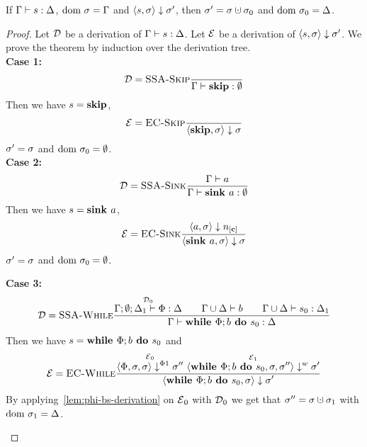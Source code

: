 \begin{theorem}
    If $\Gamma \vdash {s}: \Delta$, $\text{dom } \sigma = \Gamma$ and
    $\langle s, \sigma \rangle \downarrow \sigma'$, then $\store' = \store \dunion \store_0$
    and $\text{dom }{\sigma_0} = \Delta$.
\end{theorem}
\begin{proof}
    Let $\operatorname{\mathcal{D}}$ be a derivation of $\Gamma \vdash {s}: \Delta$.
    Let $\operatorname{\mathcal{E}}$ be a derivation of $\langle s, \sigma \rangle \downarrow \sigma'$.
    We prove the theorem by induction over the derivation tree.\\
    \textbf{Case 1:}
    \begin{align*}
        \operatorname{\mathcal{D}} = \textsc{SSA-Skip}\frac{\displaystyle }{\displaystyle \Gamma \vdash {\textbf{skip}}: \emptyset}
    \end{align*}
    Then we have $s = \textbf{skip}$,
    \begin{align*}
        \operatorname{\mathcal{E}} = \textsc{EC-Skip}\frac{\displaystyle }{\displaystyle \langle \textbf{skip}, \sigma \rangle \downarrow \sigma}
    \end{align*}
    $\sigma' = \sigma$ and $\text{dom }{\sigma_0} = \emptyset$.\\
    \textbf{Case 2:}
    \begin{align*}
        \operatorname{\mathcal{D}} = \textsc{SSA-Sink}\frac{\displaystyle \Gamma \vdash {a}}{\displaystyle \Gamma \vdash {\textbf{sink }{a}}: \emptyset}
    \end{align*}
    Then we have $s = \textbf{sink }{a}$,
    \begin{align*}
        \E =     \bsrule{EC-Sink}{\bigstep{a}{\store}{\clean{}}}
        {\bigstep{\defaultsink}{\store}{\store}}    
    \end{align*}
    $\sigma' = \sigma$ and $\text{dom }{\sigma_0} = \emptyset$.\\
    \begin{landscape}
        \textbf{Case 3:}
        \begin{align*}
            \operatorname{\mathcal{D}} = \textsc{SSA-While}\frac{\displaystyle \overset{\operatorname{\mathcal{D}}_0}{\Gamma;\emptyset;\Delta_1 \vdash {\Phi}: \Delta}\qquad
            \Gamma \cup \Delta \vdash {b}\qquad
            \Gamma \cup \Delta \vdash {s_0}: \Delta_1}{\displaystyle \Gamma \vdash {\textbf{while }\Phi;{b} \textbf{ do } {s_0}}: \Delta}
        \end{align*}
        Then we have $s = \textbf{while }\Phi;{b} \textbf{ do } {s_0}$ and
        \begin{align*}
            \E = \bsrule{EC-While}{\overset{\E_0}{\bigsteppl{\philist}{\store}{\store}{\store''}} \ 
            \overset{\E_1}{\bigstepw{\defaultssawhile}{\store}{\store''}{\store'}}}
            {\bigstep{\defaultssawhile}{\store}{\store'}}
        \end{align*}
        By applying~\autoref{lem:phi-bs-derivation} on $\operatorname{\mathcal{E}}_0$ with $\operatorname{\mathcal{D}}_0$ we get that
        $\store'' = \store \dunion \store_1$ with $\text{dom }{\sigma_1} = \Delta$.
            

\end{landscape}
\end{proof}

